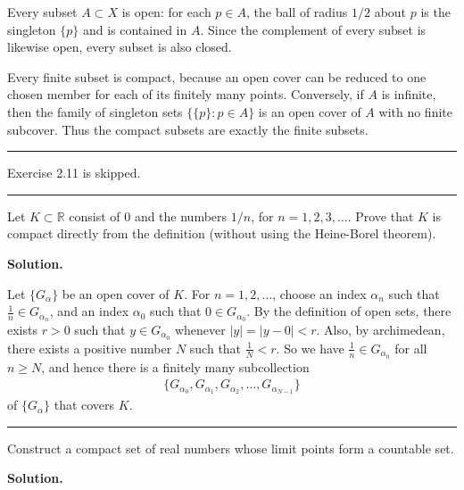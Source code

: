 \documentclass[12pt]{article}
\theoremstyle{definition}
\begin{document}
Every subset $A\subset X$ is open: for each $p\in A$, the ball of
radius $1/2$ about $p$ is the singleton $\{p\}$ and is contained in
$A$.  Since the complement of every subset is likewise open, every
subset is also closed.

Every finite subset is compact, because an open cover can be reduced to
one chosen member for each of its finitely many points.  Conversely, if
$A$ is infinite, then the family of singleton sets $\{\{p\}:p\in A\}$
is an open cover of $A$ with no finite subcover.  Thus the compact
subsets are exactly the finite subsets.



\bigskip\noindent\hrule\bigskip

Exercise 2.11 is skipped.


\bigskip\noindent\hrule\bigskip

Let $K\subset \mathbb{R}$ consist of $0$ and the numbers $1/n$, for $n=1,2,3,\ldots$. Prove that $K$ is compact directly from the definition (without using the Heine-Borel theorem).

\smallskip
\noindent\textbf{Solution.}\quad

Let $\{G_\alpha\}$ be an open cover of $K$. For $n=1,2,\ldots$, choose an index $\alpha_n$ such that $\frac{1}{n}\in G_{\alpha_n}$, and an index $\alpha_0$ such that $0\in G_{\alpha_0}$. By the definition of open sets, there exists $r>0$ such that $y\in G_{\alpha_0}$ whenever $\left\vert y\right\vert=\left\vert y-0\right\vert<r$. Also, by archimedean, there exists a positive number $N$ such that $\frac{1}{N}<r$. So we have $\frac{1}{n}\in G_{\alpha_0}$ for all $n\ge N$, and hence there is a finitely many subcollection
\begin{align*}
\{G_{\alpha_0},G_{\alpha_1},G_{\alpha_2},\ldots,G_{\alpha_{N-1}}\}
\end{align*}
of $\{G_\alpha\}$ that covers $K$.



\bigskip\noindent\hrule\bigskip

Construct a compact set of real numbers whose limit points form a countable set.

\smallskip
\noindent\textbf{Solution.}\quad
\end{document}
